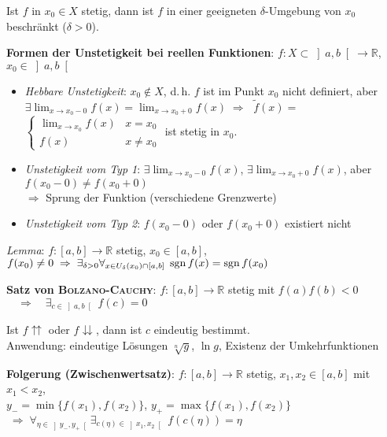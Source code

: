 Ist $f$ in $x_0 \in X$ stetig, dann ist $f$ in einer geeigneten
$\delta$-Umgebung von $x_0$ beschränkt ($\delta > 0$).

\linie

\textbf{Formen der Unstetigkeit bei reellen Funktionen}:
$f: X \subset \left]a,b\right[ \rightarrow \mathbb{R}$,
$x_0 \in \left]a,b\right[$

\begin{itemize}
    \item \emph{Hebbare Unstetigkeit}: $x_0 \notin X$, d.\,h. $f$ ist im Punkt
    $x_0$ nicht definiert, aber \\
    $\exists \lim_{x \to x_0 - 0} f(x) =
    \lim_{x \to x_0 + 0} f(x) \;\Rightarrow\;$
    $\tilde{f}(x) =$ {\small
    $\begin{cases}
    \lim_{x \to x_0} f(x) & x = x_0 \\
    f(x) & x \not= x_0
    \end{cases}$} ist stetig in $x_0$.

    \item \emph{Unstetigkeit vom Typ 1}:
    $\exists \lim_{x \to x_0 - 0} f(x)$, $\exists \lim_{x \to x_0 + 0} f(x)$,
    aber $f(x_0 - 0) \not= f(x_0 + 0)$ \\
    $\Rightarrow$ Sprung der Funktion (verschiedene Grenzwerte)

    \item \emph{Unstetigkeit vom Typ 2}:
    $f(x_0 - 0)$ oder $f(x_0 + 0)$ existiert nicht
\end{itemize}

\linie

\emph{Lemma}: $f: [a,b] \rightarrow \mathbb{R}$ stetig, $x_0 \in [a,b]$,
$f(x_0) \not= 0 \;\Rightarrow\;
\exists_{\delta > 0} \forall_{x \in U_\delta(x_0) \cap [a,b]}\;
\operatorname{sgn} f(x) = \operatorname{sgn} f(x_0)$

\textbf{Satz von \textsc{Bolzano}-\textsc{Cauchy}}:
$f: [a,b] \rightarrow \mathbb{R}$ stetig mit $f(a)f(b) < 0$
$\quad\Rightarrow\quad \exists_{c \in \left]a,b\right[}\; f(c) = 0$

Ist $f\!\!\upuparrows$ oder $f\!\!\downdownarrows$, dann ist $c$ eindeutig
bestimmt. \\
Anwendung: eindeutige Lösungen $\sqrt[n]{g}$, $\ln g$, Existenz der
Umkehrfunktionen

\textbf{Folgerung (Zwischenwertsatz)}: $f: [a,b] \rightarrow \mathbb{R}$
stetig, $x_1, x_2 \in [a,b]$ mit $x_1 < x_2$, \\
$y_- = \min\{f(x_1), f(x_2)\}$, $y_+ = \max\{f(x_1), f(x_2)\}$
$\;\Rightarrow\; \forall_{\eta \in \left]y_-,y_+\right[}
\exists_{c(\eta) \in \left]x_1,x_2\right[}\; f(c(\eta)) = \eta$

